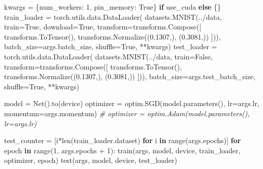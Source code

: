 \documentclass[
]{article}
\newenvironment{Shaded}{}{}
\newcommand{\BuiltInTok}[1]{#1}
\newcommand{\CommentTok}[1]{\textcolor[rgb]{0.38,0.63,0.69}{\textit{#1}}}
\newcommand{\ControlFlowTok}[1]{\textcolor[rgb]{0.00,0.44,0.13}{\textbf{#1}}}
\newcommand{\DecValTok}[1]{\textcolor[rgb]{0.25,0.63,0.44}{#1}}
\newcommand{\FloatTok}[1]{\textcolor[rgb]{0.25,0.63,0.44}{#1}}
\newcommand{\KeywordTok}[1]{\textcolor[rgb]{0.00,0.44,0.13}{\textbf{#1}}}
\newcommand{\NormalTok}[1]{#1}
\newcommand{\OperatorTok}[1]{\textcolor[rgb]{0.40,0.40,0.40}{#1}}
\newcommand{\StringTok}[1]{\textcolor[rgb]{0.25,0.44,0.63}{#1}}
\newcommand{\VariableTok}[1]{\textcolor[rgb]{0.10,0.09,0.49}{#1}}
\begin{document}
\begin{Shaded}
\begin{Highlighting}[]
\NormalTok{    kwargs }\OperatorTok{=}\NormalTok{ \{}\StringTok{\textquotesingle{}num\_workers\textquotesingle{}}\NormalTok{: }\DecValTok{1}\NormalTok{, }\StringTok{\textquotesingle{}pin\_memory\textquotesingle{}}\NormalTok{: }\VariableTok{True}\NormalTok{\} }\ControlFlowTok{if}\NormalTok{ use\_cuda }\ControlFlowTok{else}\NormalTok{ \{\}}
\NormalTok{    train\_loader }\OperatorTok{=}\NormalTok{ torch.utils.data.DataLoader(}
\NormalTok{        datasets.MNIST(}\StringTok{\textquotesingle{}../data\textquotesingle{}}\NormalTok{, train}\OperatorTok{=}\VariableTok{True}\NormalTok{, download}\OperatorTok{=}\VariableTok{True}\NormalTok{,}
\NormalTok{                       transform}\OperatorTok{=}\NormalTok{transforms.Compose([}
\NormalTok{                           transforms.ToTensor(),}
\NormalTok{                           transforms.Normalize((}\FloatTok{0.1307}\NormalTok{,), (}\FloatTok{0.3081}\NormalTok{,))}
\NormalTok{                       ])),}
\NormalTok{        batch\_size}\OperatorTok{=}\NormalTok{args.batch\_size, shuffle}\OperatorTok{=}\VariableTok{True}\NormalTok{, }\OperatorTok{**}\NormalTok{kwargs)}
\NormalTok{    test\_loader }\OperatorTok{=}\NormalTok{ torch.utils.data.DataLoader(}
\NormalTok{        datasets.MNIST(}\StringTok{\textquotesingle{}../data\textquotesingle{}}\NormalTok{, train}\OperatorTok{=}\VariableTok{False}\NormalTok{, transform}\OperatorTok{=}\NormalTok{transforms.Compose([}
\NormalTok{                           transforms.ToTensor(),}
\NormalTok{                           transforms.Normalize((}\FloatTok{0.1307}\NormalTok{,), (}\FloatTok{0.3081}\NormalTok{,))}
\NormalTok{                       ])),}
\NormalTok{        batch\_size}\OperatorTok{=}\NormalTok{args.test\_batch\_size, shuffle}\OperatorTok{=}\VariableTok{True}\NormalTok{, }\OperatorTok{**}\NormalTok{kwargs)}
\end{Highlighting}
\end{Shaded}

\begin{Shaded}
\begin{Highlighting}[]
\NormalTok{    model }\OperatorTok{=}\NormalTok{ Net().to(device)}
\NormalTok{    optimizer }\OperatorTok{=}\NormalTok{ optim.SGD(model.parameters(), lr}\OperatorTok{=}\NormalTok{args.lr, momentum}\OperatorTok{=}\NormalTok{args.momentum)}
    \CommentTok{\# optimizer = optim.Adam(model.parameters(), lr=args.lr)}
                          
\NormalTok{    test\_counter }\OperatorTok{=}\NormalTok{ [i}\OperatorTok{*}\BuiltInTok{len}\NormalTok{(train\_loader.dataset) }\ControlFlowTok{for}\NormalTok{ i }\KeywordTok{in} \BuiltInTok{range}\NormalTok{(args.epochs)]}
    \ControlFlowTok{for}\NormalTok{ epoch }\KeywordTok{in} \BuiltInTok{range}\NormalTok{(}\DecValTok{1}\NormalTok{, args.epochs }\OperatorTok{+} \DecValTok{1}\NormalTok{):}
\NormalTok{        train(args, model, device, train\_loader, optimizer, epoch)}
\NormalTok{        test(args, model, device, test\_loader)}
\end{Highlighting}
\end{Shaded}
\end{document}

